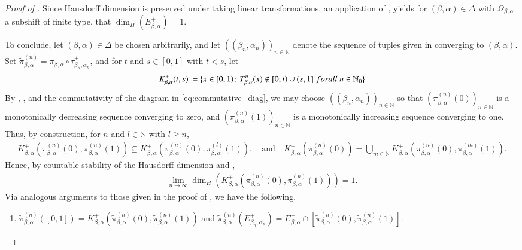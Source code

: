 \documentclass[a4paper,reqno,10pt]{amsart}
\begin{document}
\begin{proof}[Proof of \texorpdfstring{}{Corollary 1.5}]
Since Hausdorff dimension is preserved under taking linear transformations, an application of , yields for $(\beta, \alpha) \in \Delta$ with $\Omega_{\beta,\alpha}$ a subshift of finite type, that $\dim_H (E_{\beta,\alpha}^{+}) = 1$. 

To conclude, let $(\beta,\alpha) \in \Delta$ be chosen arbitrarily, and let $((\beta_{n},\alpha_{n}))_{n \in \mathbb{N}}$ denote the sequence of tuples given in  converging to $(\beta, \alpha)$. Set $\tilde{\pi}_{\beta, \alpha}^{(n)} = \pi_{\beta,\alpha} \circ \tau^{+}_{\beta_{n},\alpha_{n}}$, and for $t$ and $s \in [0,1]$ with $t < s$, let
    \begin{align*}
        K_{\beta,\alpha}^{+}(t, s) \coloneqq \{ x \in[0, 1) \colon T_{\beta,\alpha}^{n}(x) \not \in [0,t) \cup (s, 1] \; \textup{for all} \; n \in \mathbb{N}_{0} \}
    \end{align*}
By , , and the commutativity of the diagram in \eqref{eq:commutative_diag}, we may choose $((\beta_{n},\alpha_{n}))_{n \in \mathbb{N}}$ so that $(\pi_{\beta,\alpha}^{(n)}(0))_{n \in \mathbb{N}}$ is a monotonically decreasing sequence converging to zero, and $(\pi_{\beta,\alpha}^{(n)}(1))_{n \in \mathbb{N}}$ is a monotonically increasing sequence converging to one. Thus, by construction, for $n$ and $l \in \mathbb{N}$ with $l \geq n$,
    \begin{align*}
        K_{\beta,\alpha}^{+}(\pi_{\beta,\alpha}^{(n)}(0), \pi_{\beta,\alpha}^{(n)}(1)) \subseteq K_{\beta,\alpha}^{+}(\pi_{\beta,\alpha}^{(n)}(0), \pi_{\beta,\alpha}^{(l)}(1)),
        \quad \text{and} \quad 
        K_{\beta,\alpha}^{+}(\pi_{\beta,\alpha}^{(n)}(0)) = \bigcup_{m \in \mathbb{N}} K_{\beta,\alpha}^{+}(\pi_{\beta,\alpha}^{(n)}(0), \pi_{\beta,\alpha}^{(m)}(1)).
    \end{align*}
Hence, by countable stability of the Hausdorff dimension and ,
    \begin{align}\label{eq:limit_hausdorff_proj_0,1}
        \lim_{n \to \infty} \dim_{H}(K_{\beta,\alpha}^{+}(\pi_{\beta,\alpha}^{(n)}(0),\pi_{\beta,\alpha}^{(n)}(1))) = 1.   
    \end{align}
Via analogous arguments to those given in the proof of , we have the following.
    \begin{enumerate}
        \item[($1^{*}$)]  $\tilde{\pi}_{\beta,\alpha}^{(n)}([0,1])=K_{\beta,\alpha}^+(\tilde{\pi}_{\beta,\alpha}^{(n)}(0), \tilde{\pi}_{\beta,\alpha}^{(n)}(1))$ and $\tilde{\pi}_{\beta,\alpha}^{(n)}(E_{\beta_{n},\alpha_{n}}^+)=E_{\beta, \alpha}^+\cap[\tilde{\pi}_{\beta,\alpha}^{(n)}(0),\tilde{\pi}_{\beta,\alpha}^{(n)}(1)]$.

\end{enumerate}
\end{proof}
\end{document}
